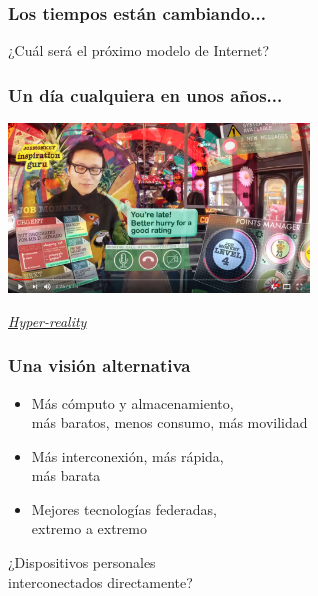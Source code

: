 \documentclass[17pt,aspectratio=169]{beamer}
\begin{document}
\begin{frame}[fragile]
  \frametitle{Los tiempos están cambiando...}


  ¿Cuál será el próximo modelo de Internet?
  
\end{frame}

\begin{frame}[fragile]
\frametitle{Un día cualquiera en unos años...}

  \begin{center}
  \includegraphics[width=8cm]{figs/hyper-reality}
  \end{center}

  \begin{flushright}
    {\em \tiny
      \href{https://www.youtube.com/watch?v=YJg02ivYzSs}{Hyper-reality}}
  \end{flushright}
  
\end{frame}


\begin{frame}
\frametitle{Una visión alternativa}

\begin{itemize}
\item Más cómputo y almacenamiento, \\
  más baratos, menos consumo, más movilidad \\
\item Más interconexión, más rápida, \\
  más barata \\
\item Mejores tecnologías federadas, \\
  extremo a extremo \\
\end{itemize}

  \begin{flushright}
  ¿Dispositivos personales \\
  interconectados directamente? \\
  \end{flushright}

\end{frame}
\end{document}

